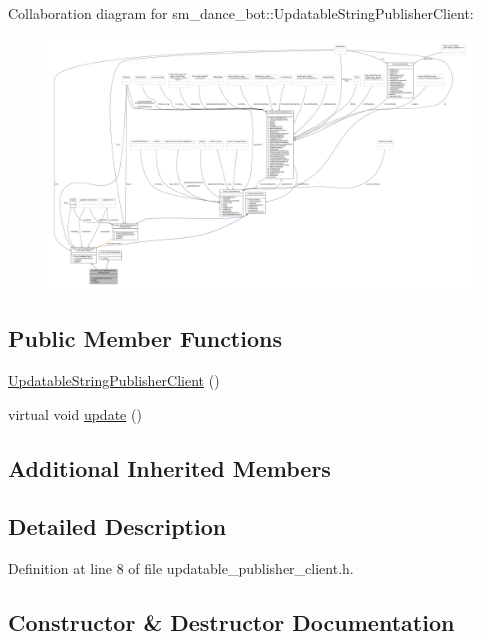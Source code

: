 Collaboration diagram for sm\+\_\+dance\+\_\+bot\+:\+:Updatable\+String\+Publisher\+Client\+:
\nopagebreak
\begin{figure}[H]
\begin{center}
\leavevmode
\includegraphics[width=350pt]{classsm__dance__bot_1_1UpdatableStringPublisherClient__coll__graph}
\end{center}
\end{figure}
\subsection*{Public Member Functions}
\begin{DoxyCompactItemize}
\item 
\hyperlink{classsm__dance__bot_1_1UpdatableStringPublisherClient_a46571b3d36aeab58120d7a7568492b6d}{Updatable\+String\+Publisher\+Client} ()
\item 
virtual void \hyperlink{classsm__dance__bot_1_1UpdatableStringPublisherClient_a0b966129e1fee0cd1bc24861177bdb17}{update} ()
\end{DoxyCompactItemize}
\subsection*{Additional Inherited Members}


\subsection{Detailed Description}


Definition at line 8 of file updatable\+\_\+publisher\+\_\+client.\+h.



\subsection{Constructor \& Destructor Documentation}
